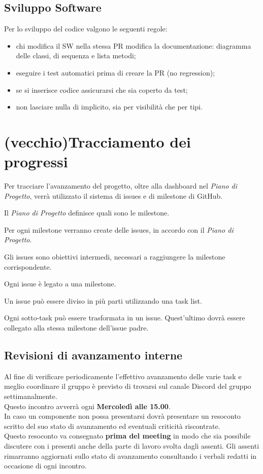 \documentclass[a4paper, 12pt]{article}
\begin{document}
\subsection{Sviluppo Software}\label{norme-sw}
Per lo sviluppo del codice valgono le seguenti regole:
\begin{itemize}
	\item chi modifica il SW nella stessa PR modifica la documentazione: diagramma delle classi, di sequenza e lista metodi;
    \item eseguire i test automatici prima di creare la PR (no regression);
    \item se si inserisce codice assicurarsi che sia coperto da test;
    \item non lasciare nulla di implicito, sia per visibilità che per tipi.
\end{itemize}

\section{(vecchio)Tracciamento dei progressi}
Per tracciare l'avanzamento del progetto, oltre alla dashboard nel \textit{Piano di Progetto}, verrà utilizzato il sistema di issues e di milestone di GitHub.

Il \textit{Piano di Progetto} definisce quali sono le milestone.

Per ogni milestone verranno create delle issues, in accordo con il \textit{Piano di Progetto}.

Gli issues sono obiettivi intermedi, necessari a raggiungere la milestone corrispondente.

Ogni issue è legato a una milestone.

Un issue può essere diviso in più parti utilizzando una task list.

Ogni sotto-task può essere trasformata in un issue. Quest'ultimo dovrà essere collegato alla stessa milestone dell'issue padre.

\subsection{Revisioni di avanzamento interne}\label{revisioni-di-avanzamento-interne}
Al fine di verificare periodicamente l'effettivo avanzamento delle varie task e meglio coordinare il gruppo è previsto di trovarsi sul canale Discord del gruppo settimanalmente.\\

Questo incontro avverrà ogni \textbf{Mercoledì alle 15.00}.\\

In caso un componente non possa presentarsi dovrà presentare un resoconto scritto del suo stato di avanzamento ed eventuali criticità riscontrate.\\

Questo resoconto va consegnato \textbf{prima del meeting} in modo che sia possibile discutere con i presenti anche della parte di lavoro svolta dagli assenti.
Gli assenti rimarranno aggiornati sullo stato di avanzamento consultando i verbali redatti in occasione di ogni incontro.
\end{document}
